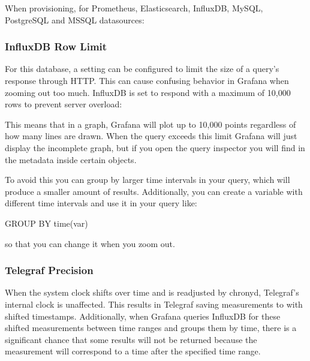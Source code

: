 \documentclass[letterpaper,10pt,english]{sphinxmanual}
\begin{document}
When provisioning,
 for Prometheus, Elasticsearch, InfluxDB, MySQL, PostgreSQL and
MSSQL datasources:

\begin{sphinxVerbatim}[commandchars=\\\{\}]
    
\end{sphinxVerbatim}


\subsubsection{InfluxDB Row Limit}
\label{\detokenize{readme:influxdb-row-limit}}
For this database, a setting can be configured to limit the size of a query’s
response through HTTP. This can cause confusing behavior in Grafana when
zooming out too much. InfluxDB is set to respond with a maximum of 10,000 rows
to prevent server overload:

\begin{sphinxVerbatim}[commandchars=\\\{\}]
\PYG{p}{[}\PYG{p}{]}
     
\end{sphinxVerbatim}

This means that in a graph, Grafana will plot up to
10,000 points regardless of how many lines are drawn. When the query exceeds
this limit Grafana will just display the incomplete graph, but if you open the
query inspector you will find  in the metadata inside certain
objects.

To avoid this you can group by larger time intervals in your query, which will
produce a smaller amount of results. Additionally, you can create a variable
with different time intervals and use it in your query like:

\begin{sphinxVerbatim}[commandchars=\\\{\}]
GROUP BY time(\PYGZdl{}var)
\end{sphinxVerbatim}

so that you can change it when you zoom out.



\subsubsection{Telegraf Precision}
\label{\detokenize{readme:telegraf-precision}}
When the system clock shifts over time and is readjusted by chronyd, Telegraf’s
internal clock is unaffected. This results in Telegraf saving measurements to
with shifted timestamps. Additionally, when Grafana queries InfluxDB for these
shifted measurements between time ranges and groups them by time, there is a
significant chance that some results will not be returned because the
measurement will correspond to a time after the specified time range.
\end{document}
